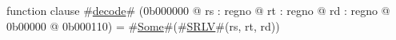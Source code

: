 function clause #\hyperref[zdecode]{decode}# (0b000000 @ rs : regno @ rt : regno @ rd : regno @ 0b00000 @ 0b000110) =
  #\hyperref[zSome]{Some}#(#\hyperref[zSRLV]{SRLV}#(rs, rt, rd))
